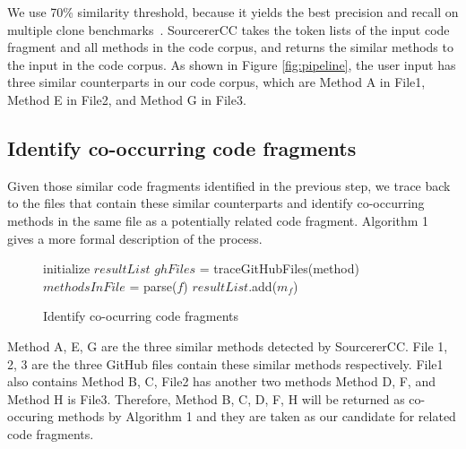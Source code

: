 We use 70\% similarity threshold, because it yields the best precision and recall on multiple clone benchmarks~\cite{sajnani2016sourcerercc}. SourcererCC takes the token lists of the input code fragment and all methods in the code corpus, and returns the similar methods to the input in the code corpus. As shown in Figure \ref{fig:pipeline}, the user input has three similar counterparts in our code corpus, which are {\ttt Method A} in {\ttt File1}, {\ttt Method E} in {\ttt File2}, and {\ttt Method G} in {\ttt File3}.

\subsection{Identify co-occurring code fragments}
Given those similar code fragments identified in the previous step, we trace back to the files that contain these similar counterparts and identify co-occurring methods in the same file as a potentially related code fragment. Algorithm 1 gives a more formal description of the process.

\begin{figure}[h]
		\label{alg: co-occur}
 \removelatexerror
\begin{algorithm}[H]
	\caption{Identify co-ocurring code fragments}
	initialize $resultList$\;
	{
		$ghFiles$ = traceGitHubFiles(method) \;
		{
			$methodsInFile$ = parse($f$)\;
			{
				{
					$resultList$.add($m_f$) \;
				}
			}
		} 
	}
\end{algorithm}
\end{figure}

{\ttt Method A, E, G} are the three similar methods detected by SourcererCC. {\ttt File 1, 2, 3} are the three GitHub files contain these similar methods respectively. 
{\ttt File1} also contains {\ttt Method B, C}, {\ttt File2} has another two methods {\ttt Method D, F}, and {\ttt Method H} is {\ttt File3}. Therefore, {\ttt Method B, C, D, F, H} will be returned as co-occuring methods by Algorithm 1 and they are taken as our candidate for related code fragments.

